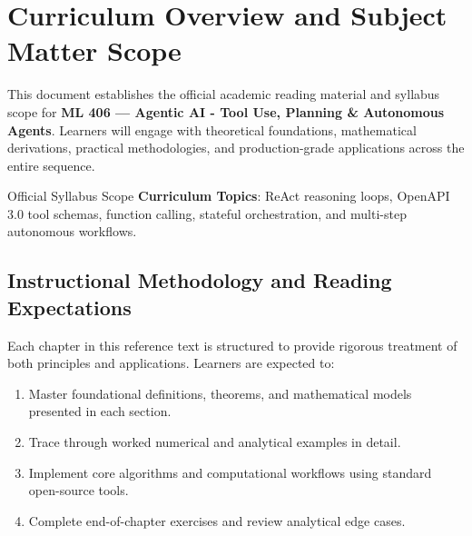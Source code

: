 \section{Curriculum Overview and Subject Matter Scope}

This document establishes the official academic reading material and syllabus scope for \textbf{ML 406 --- Agentic AI - Tool Use, Planning \& Autonomous Agents}. Learners will engage with theoretical foundations, mathematical derivations, practical methodologies, and production-grade applications across the entire sequence.

\begin{InsightBox}{Official Syllabus Scope}
  \textbf{Curriculum Topics}: ReAct reasoning loops, OpenAPI 3.0 tool schemas, function calling, stateful orchestration, and multi-step autonomous workflows.
\end{InsightBox}

\subsection{Instructional Methodology and Reading Expectations}

Each chapter in this reference text is structured to provide rigorous treatment of both principles and applications. Learners are expected to:
\begin{enumerate}
  \item Master foundational definitions, theorems, and mathematical models presented in each section.
  \item Trace through worked numerical and analytical examples in detail.
  \item Implement core algorithms and computational workflows using standard open-source tools.
  \item Complete end-of-chapter exercises and review analytical edge cases.
\end{enumerate}

